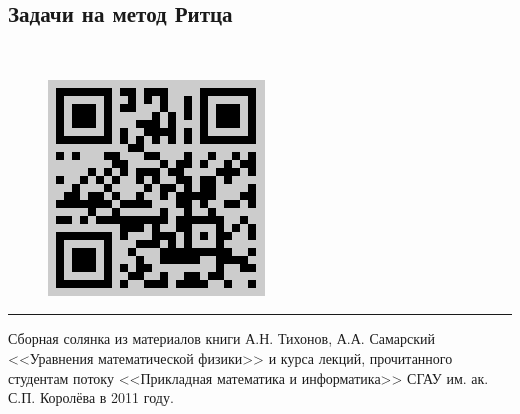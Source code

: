 \documentclass[12pt, a4paper]{article}
\begin{document}
	\subsection{Задачи на метод Ритца}
			

\newpage
~
\thispagestyle{empty}
\vfill
\pagecolor[rgb]{0.8,0.8,0.8}
\hfill
\begin{figure}[t!]
\centering
\includegraphics[scale=0.4]{link.png}
\end{figure}
\begin{minipage}{10.5cm}

\textcolor[rgb]{0,0,0}{
\hrule height 0.5pt
\vspace{3pt}
Сборная солянка из материалов книги А.Н. Тихонов, А.А. Самарский <<Уравнения математической физики>> и курса лекций, прочитанного студентам потоку <<Прикладная математика и информатика>> СГАУ им. ак. С.П. Королёва в 2011 году. \\
}


\end{minipage}
\end{document}
